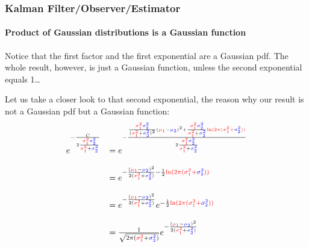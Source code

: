 \begin{frame}[plain]\pw\Large
\frametitle{Kalman Filter/Observer/Estimator}
\framesubtitle{Product of Gaussian distributions is a Gaussian function}


\scriptsize
Notice that the first factor and the first exponential are a Gaussian pdf. The whole result, however, is just a Gaussian function, unless the second exponential equals 1…

Let us take a closer look to that second exponential, the reason why our result is not a Gaussian pdf but a Gaussian function:
\begin{equation*}
\begin{array}{rlllllll}
e^{- \frac {C}{2 \frac{\varone \vartwo}{\varone + \vartwo}} }&=   e^{- \frac { \frac { \varone \vartwo }{ (\varone + \vartwo)^2 } ({\muone} - {\mutwo} )^2+\frac { \varone \vartwo }{ \varone + \vartwo } \myalpha }        {2 \frac{\varone \vartwo}{\varone + \vartwo}} }\\\\
&=e^{- \frac { ({\muone} - {\mutwo} )^2 }{ 2 (\varone + \vartwo) }         - \frac{1}{2} \myalpha       } \\\\
&=   e^{- \frac { ({\muone} - {\mutwo} )^2 }{ 2( \varone + \vartwo )} }   e^{- \frac{1}{2} \myalpha } \\\\
&= \frac {1}{ \sqrt{2 \pi (\varone + \vartwo)} }   e^{- \frac { ({\muone} - {\mutwo} )^2 }{ 2(\varone + \vartwo) } }
\end{array}
\end{equation*}

\end{frame}





